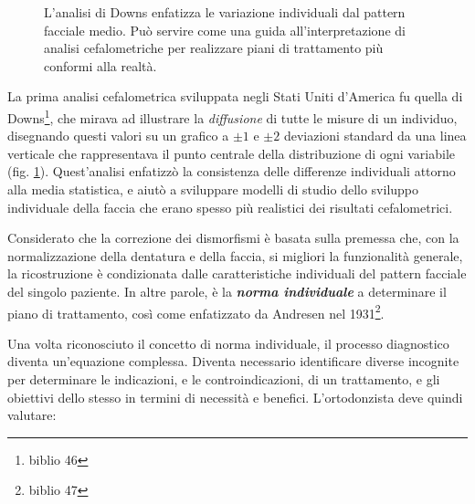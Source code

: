 \begin{figure}
\centering
{}
\caption{L'analisi di Downs enfatizza le variazione individuali dal pattern facciale medio. Può servire come una guida all'interpretazione di analisi cefalometriche per realizzare piani di trattamento più conformi alla realtà.}
\label{fig:downs}
\end{figure}

La prima analisi cefalometrica sviluppata negli Stati Uniti d'America fu quella di Downs\footnote{biblio 46}, che mirava ad illustrare la \textit{diffusione} di tutte le misure di un individuo, disegnando questi valori su un grafico a $\pm1$ e $\pm2$ deviazioni standard da una linea verticale che rappresentava il punto centrale della distribuzione di ogni variabile (fig. \ref{fig:downs}). Quest'analisi enfatizzò la consistenza delle differenze individuali attorno alla media statistica, e aiutò a sviluppare modelli di studio dello sviluppo individuale della faccia che erano spesso più realistici dei risultati cefalometrici.

Considerato che la correzione dei dismorfismi è basata sulla premessa che, con la normalizzazione della dentatura e della faccia, si migliori la funzionalità generale, la ricostruzione è condizionata dalle caratteristiche individuali del pattern facciale del singolo paziente. In altre parole, è la \textbf{\textit{norma individuale}} a determinare il piano di trattamento, così come enfatizzato da Andresen nel 1931\footnote{biblio 47}.

Una volta riconosciuto il concetto di norma individuale, il processo diagnostico diventa un'equazione complessa. Diventa necessario identificare diverse incognite per determinare le indicazioni, e le controindicazioni, di un trattamento, e gli obiettivi dello stesso in termini di necessità e benefici. L'ortodonzista deve quindi valutare:

